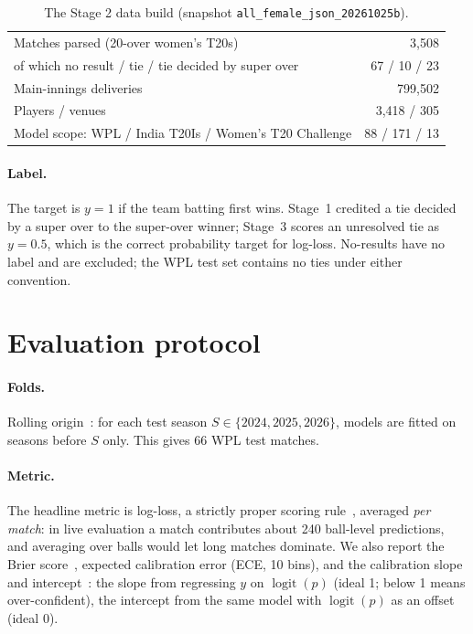 \documentclass[11pt]{article}
\newcommand{\code}[1]{\texttt{#1}}
\begin{document}
\begin{table}[t]\centering\small
\caption{The Stage 2 data build (snapshot \code{all\_female\_json\_20261025b}).}\label{tab:data}
\begin{tabular}{lr}\toprule
Matches parsed (20-over women's T20s) & 3{,}508 \\
\quad of which no result / tie / tie decided by super over & 67 / 10 / 23 \\
Main-innings deliveries & 799{,}502 \\
Players / venues & 3{,}418 / 305 \\
Model scope: WPL / India T20Is / Women's T20 Challenge & 88 / 171 / 13 \\
\bottomrule\end{tabular}
\end{table}

\paragraph{Label.} The target is $y=1$ if the team batting first wins. Stage~1 credited a tie decided by
a super over to the super-over winner; Stage~3 scores an unresolved tie as $y=0.5$, which is the correct
probability target for log-loss. No-results have no label and are excluded; the WPL test set contains no
ties under either convention.

\section{Evaluation protocol}\label{sec:protocol}

\paragraph{Folds.} Rolling origin~\citep{tashman2000}: for each test season
$S\in\{2024,2025,2026\}$, models are fitted on seasons before $S$ only. This gives 66 WPL test matches.

\paragraph{Metric.} The headline metric is log-loss, a strictly proper scoring rule~\citep{gneiting2007},
averaged \emph{per match}: in live evaluation a match contributes about 240 ball-level predictions, and
averaging over balls would let long matches dominate. We also report the Brier score~\citep{brier1950},
expected calibration error (ECE, 10 bins), and the calibration slope and intercept~\citep{collins2015,vancalster2019}:
the slope from regressing $y$ on $\operatorname{logit}(p)$ (ideal 1; below 1 means over-confident), the
intercept from the same model with $\operatorname{logit}(p)$ as an offset (ideal 0).
\end{document}
